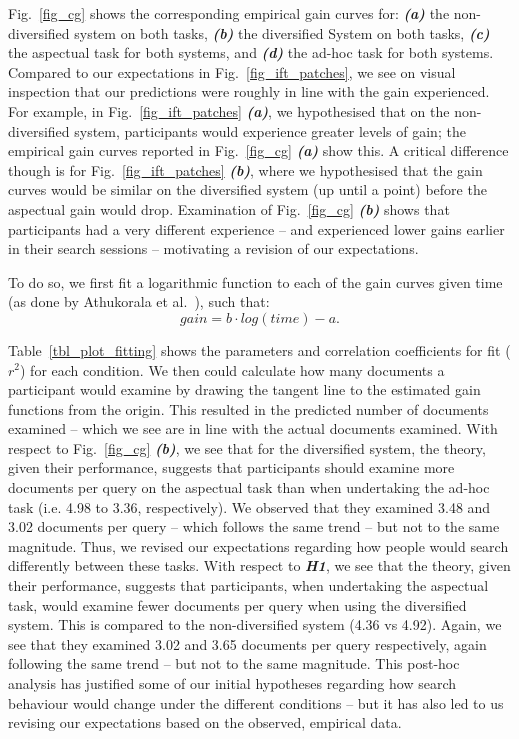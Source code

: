 Fig.~\ref{fig_cg} shows the corresponding empirical gain curves for: \textit{\textbf{(a)}} the non-diversified system on both tasks, \textit{\textbf{(b)}} the diversified System on both tasks, \textit{\textbf{(c)}} the aspectual task for both systems, and \textit{\textbf{(d)}} the ad-hoc task for both systems. Compared to our expectations in Fig.~\ref{fig_ift_patches}, we see on visual inspection that our predictions were roughly in line with the gain experienced. For example, in Fig.~\ref{fig_ift_patches} \textit{\textbf{(a)}}, we hypothesised that on the non-diversified system, participants would experience greater levels of gain; the empirical gain curves reported in Fig.~\ref{fig_cg} \emph{\textbf{(a)}} show this. A critical difference though is for Fig.~\ref{fig_ift_patches} \textit{\textbf{(b)}}, where we hypothesised that the gain curves would be similar on the diversified system (up until a point) before the aspectual gain would drop. Examination of Fig.~\ref{fig_cg} \textit{\textbf{(b)}} shows that participants had a very different experience -- and experienced lower gains earlier in their search sessions -- motivating a revision of our expectations.

To do so, we first fit a logarithmic function to each of the gain curves given time (as done by Athukorala et al.~\cite{ath2014ift}), such that:
\begin{equation}
gain = b \cdot log(time) - a.
\end{equation}

Table~\ref{tbl_plot_fitting} shows the parameters and correlation coefficients for fit ($r^2$) for each condition. We then could calculate how many documents a participant would examine by drawing the tangent line to the estimated gain functions from the origin. This resulted in the predicted number of documents examined -- which we see are in line with the actual documents examined. With respect to Fig.~\ref{fig_cg} \textit{\textbf{(b)}}, we see that for the diversified system, the theory, given their performance, suggests that participants should examine more documents per query on the aspectual task than when undertaking the ad-hoc task (i.e. 4.98 to 3.36, respectively). We observed that they examined 3.48 and 3.02 documents per query -- which follows the same trend -- but not to the same magnitude. Thus, we revised our expectations regarding how people would search differently between these tasks. With respect to \textit{\textbf{H1}}, we see that the theory, given their performance, suggests that participants, when undertaking the aspectual task, would examine fewer documents per query when using the diversified system. This is compared to the non-diversified system (4.36 vs 4.92). Again, we see that they examined 3.02 and 3.65 documents per query respectively, again following the same trend -- but not to the same magnitude. This post-hoc analysis has justified some of our initial hypotheses regarding how search behaviour would change under the different conditions -- but it has also led to us revising our expectations based on the observed, empirical data.


